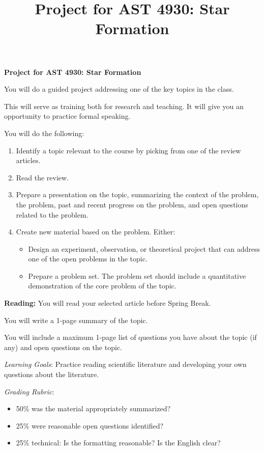 \documentclass{article}
\begin{document}
\title{Project for AST 4930: Star Formation}
\noindent \textbf{\large Project for AST 4930: Star Formation}

You will do a guided project addressing one of the key topics in the
class.

This will serve as training both for research and teaching.
It will give you an opportunity to practice formal speaking.

You will do the following:
\begin{enumerate}
    \item Identify a topic relevant to the course by picking from one of the review articles.
    \item Read the review.  
    \item Prepare a presentation on the topic, summarizing the context of the
        problem, the problem, past and recent progress on the problem, and open
        questions related to the problem.
    \item Create new material based on the problem.  Either:
    \begin{itemize}
        \item Design an experiment, observation, or theoretical project that can
            address one of the open problems in the topic.  
        \item Prepare a problem set.  The problem set should
            include a quantitative demonstration of the core problem of the topic.
    \end{itemize}
\end{enumerate}



\noindent \textbf{Reading:}
You will read your selected article before Spring Break.

You will write a 1-page summary of the topic.  

You will include a maximum 1-page list of questions you have about the topic
(if any) and open questions on the topic.

\textit{Learning Goals}: Practice reading scientific literature and developing
your own questions about the literature.

\textit{Grading Rubric}:
\begin{itemize}
    \item 50\% was the material appropriately summarized?
    \item 25\% were reasonable open questions identified?
    \item 25\% technical: Is the formatting reasonable?  Is the English clear?
\end{itemize}
\end{document}
